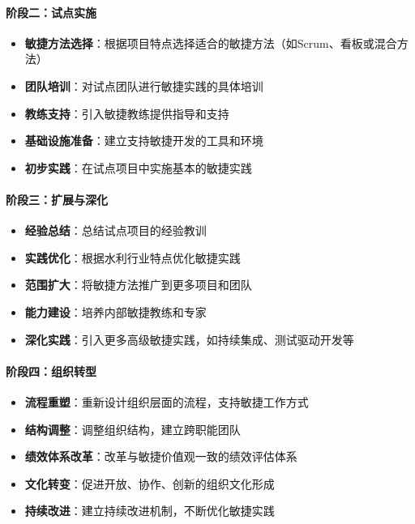 \paragraph{阶段二：试点实施}\label{ux9636ux6bb5ux4e8cux8bd5ux70b9ux5b9eux65bd}

\begin{itemize}
\tightlist
\item
  \textbf{敏捷方法选择}：根据项目特点选择适合的敏捷方法（如Scrum、看板或混合方法）
\item
  \textbf{团队培训}：对试点团队进行敏捷实践的具体培训
\item
  \textbf{教练支持}：引入敏捷教练提供指导和支持
\item
  \textbf{基础设施准备}：建立支持敏捷开发的工具和环境
\item
  \textbf{初步实践}：在试点项目中实施基本的敏捷实践
\end{itemize}

\paragraph{阶段三：扩展与深化}\label{ux9636ux6bb5ux4e09ux6269ux5c55ux4e0eux6df1ux5316}

\begin{itemize}
\tightlist
\item
  \textbf{经验总结}：总结试点项目的经验教训
\item
  \textbf{实践优化}：根据水利行业特点优化敏捷实践
\item
  \textbf{范围扩大}：将敏捷方法推广到更多项目和团队
\item
  \textbf{能力建设}：培养内部敏捷教练和专家
\item
  \textbf{深化实践}：引入更多高级敏捷实践，如持续集成、测试驱动开发等
\end{itemize}

\paragraph{阶段四：组织转型}\label{ux9636ux6bb5ux56dbux7ec4ux7ec7ux8f6cux578b}

\begin{itemize}
\tightlist
\item
  \textbf{流程重塑}：重新设计组织层面的流程，支持敏捷工作方式
\item
  \textbf{结构调整}：调整组织结构，建立跨职能团队
\item
  \textbf{绩效体系改革}：改革与敏捷价值观一致的绩效评估体系
\item
  \textbf{文化转变}：促进开放、协作、创新的组织文化形成
\item
  \textbf{持续改进}：建立持续改进机制，不断优化敏捷实践
\end{itemize}

